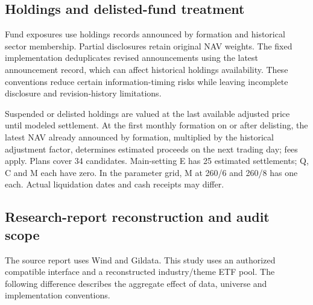 \clearpage\subsection{Holdings and delisted-fund treatment}
Fund exposures use holdings records announced by formation and historical sector membership. Partial disclosures retain original NAV weights. The fixed implementation deduplicates revised announcements using the latest announcement record, which can affect historical holdings availability. These conventions reduce certain information-timing risks while leaving incomplete disclosure and revision-history limitations.

Suspended or delisted holdings are valued at the last available adjusted price until modeled settlement. At the first monthly formation on or after delisting, the latest NAV already announced by formation, multiplied by the historical adjustment factor, determines estimated proceeds on the next trading day; fees apply. Plans cover 34 candidates. Main-setting E has 25 estimated settlements; Q, C and M each have zero. In the parameter grid, M at 260/6 and 260/8 has one each. Actual liquidation dates and cash receipts may differ.

\subsection{Research-report reconstruction and audit scope}
The source report uses Wind and Gildata. This study uses an authorized compatible interface and a reconstructed industry/theme ETF pool. The following difference describes the aggregate effect of data, universe and implementation conventions.

\begingroup\footnotesize\setlength{\tabcolsep}{4pt}\renewcommand{\arraystretch}{1.1}

